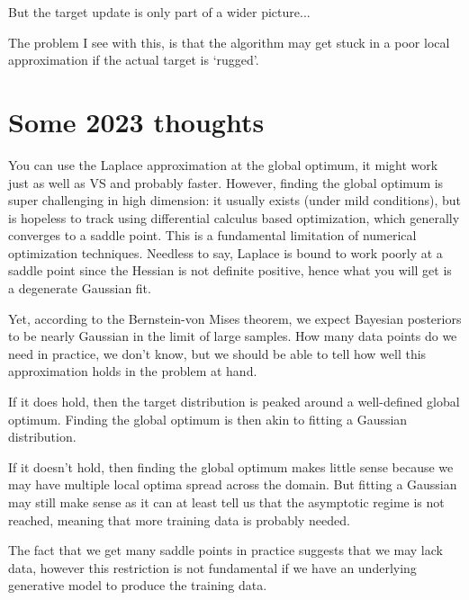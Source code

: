 \documentclass{article}
\begin{document}
But the target update is only part of a wider picture...

The problem I see with this, is that the algorithm may get stuck in a poor local approximation if the actual target is `rugged'.

\section{Some 2023 thoughts}

You can use the Laplace approximation at the global optimum, it might work just as well as VS and probably faster. However, finding the global optimum is super challenging in high dimension: it usually exists (under mild conditions), but is hopeless to track using differential calculus based optimization, which generally converges to a saddle point. This is a fundamental limitation of numerical optimization techniques. Needless to say, Laplace is bound to work poorly at a saddle point since the Hessian is not definite positive, hence what you will get is a degenerate Gaussian fit.

Yet, according to the Bernstein-von Mises theorem, we expect Bayesian posteriors to be nearly Gaussian in the limit of large samples. How many data points do we need in practice, we don't know, but we should be able to tell how well this approximation holds in the problem at hand.

If it does hold, then the target distribution is peaked around a well-defined global optimum. Finding the global optimum is then akin to fitting a Gaussian distribution. 

If it doesn't hold, then finding the global optimum makes little sense because we may have multiple local optima spread across the domain. But fitting a Gaussian may still make sense as it can at least tell us that the asymptotic regime is not reached, meaning that more training data is probably needed.

The fact that we get many saddle points in practice suggests that we may lack data, however this restriction is not fundamental if we have an underlying generative model to produce the training data. 






\end{document}
